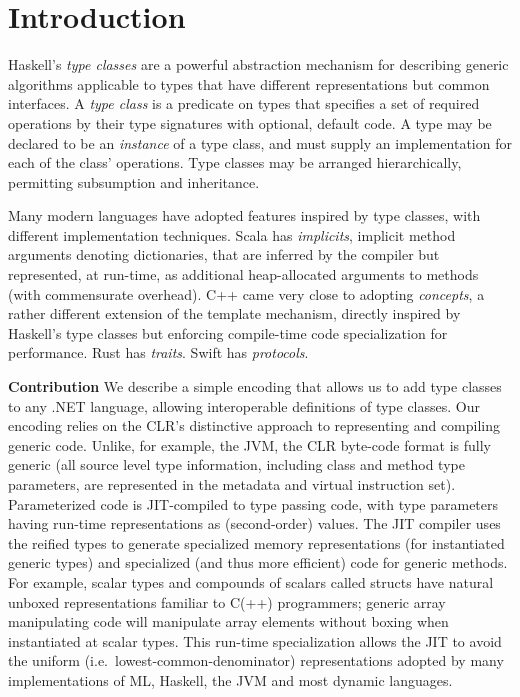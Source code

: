 \documentclass{elsarticle}
\begin{document}


\section{Introduction}

Haskell's \emph{type classes} \cite{peytonjones:h98,WadlerBlott} are a powerful abstraction mechanism for describing generic algorithms applicable to types that have different representations but common interfaces.
A \emph{type class} is a predicate on types that specifies a set of required operations by their type signatures with  optional, default code.
A type may be declared to be an \emph{instance} of a type class, and must supply an implementation for each of the class' operations. 
Type classes may be arranged hierarchically, permitting subsumption and inheritance. 

Many modern languages have adopted features inspired
by type classes, with different implementation techniques.  Scala has
\emph{implicits}\cite{scalaimplicits}, implicit method arguments denoting dictionaries, that
are inferred by the compiler but represented, at run-time, as additional
heap-allocated arguments to methods (with commensurate overhead).  C++ came very
close to adopting \emph{concepts}\cite{cppconcepts}, a rather different extension of the template mechanism, 
directly inspired by Haskell's type classes but enforcing  compile-time code specialization for performance. Rust has \emph{traits}\cite{Rust}. Swift has
\emph{protocols}\cite{Swift}.

{\bf Contribution} We describe a simple encoding that allows us to add type classes to
any .NET language, allowing interoperable definitions of type
classes. Our encoding relies on the CLR's distinctive approach to
representing and compiling generic code\cite{genericspldi,genericspopl}. Unlike, for example, the JVM, the CLR
byte-code format is fully generic (all source level type information,
including class and method type parameters, are represented in the
metadata and virtual instruction set).  Parameterized code is JIT-compiled to type passing code,
with type parameters having run-time representations as (second-order)
values.  The JIT compiler uses the reified types to generate
specialized memory representations (for instantiated generic types)
and specialized (and thus more efficient) code for generic
methods. For example, scalar types and compounds of scalars called
structs have natural unboxed representations familiar to C(++)
programmers; generic array manipulating code will manipulate array
elements without boxing when instantiated at scalar types.  This run-time
specialization allows the JIT to avoid the uniform (i.e.\ lowest-common-denominator) representations adopted by many implementations of ML, 
Haskell, the JVM and most dynamic languages.
\end{document}
